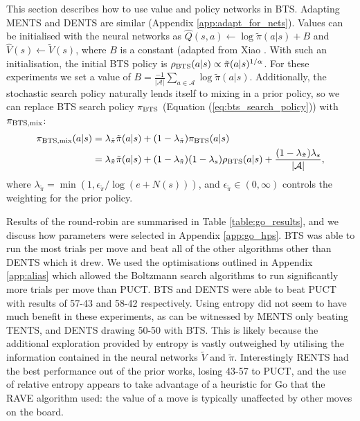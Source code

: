             This section describes how to use value and policy networks in BTS. Adapting MENTS and DENTS are similar (Appendix \ref{app:adapt_for_nets}). Values can be initialised with the neural networks as $\hat{Q}(s,a)\leftarrow\log \tilde{\pi}(a|s)+B$ and $\hat{V}(s)\leftarrow\tilde{V}(s)$, where $B$ is a constant (adapted from Xiao \etal {}%
            . With such an initialisation, the initial BTS policy is 
            $\rho_{\textnormal{BTS}}(a|s)\propto\tilde{\pi}(a|s)^{1/\alpha}$. For these experiments we set a value of $B=\frac{-1}{|\mathcal{A}|}\sum_{a\in\mathcal{A}} \log\tilde{\pi}(a|s)$. Additionally, the stochastic search policy naturally lends itself to mixing in a prior policy, so we can replace BTS search policy $\pi_{\textnormal{BTS}}$ (Equation (\ref{eq:bts_search_policy})) with $\pi_{\textnormal{BTS,mix}}$:
            \begin{align}
                \pi_{\textnormal{BTS,mix}}(a|s) 
                &= \lambda_{\tilde{\pi}}\tilde{\pi}(a|s) + (1-\lambda_{\tilde{\pi}}) \pi_{\textnormal{BTS}}(a|s) \\
                &= \lambda_{\tilde{\pi}}\tilde{\pi}(a|s) + (1-\lambda_{\tilde{\pi}})(1-\lambda_s)\rho_{\textnormal{BTS}}(a|s) + \frac{(1-\lambda_{\tilde{\pi}})\lambda_s}{|\cl{A}|}, %
            \end{align}
            where $\lambda_{\tilde{\pi}}=\min(1,\epsilon_{\tilde{\pi}}/\log(e+N(s)))$, and $\epsilon_{\tilde{\pi}} \in (0,\infty)$ controls the weighting for the prior policy. 

            Results of the round-robin are summarised in Table \ref{table:go_results}, and we discuss how parameters were selected in Appendix \ref{app:go_hps}. BTS was able to run the most trials per move and beat all of the other algorithms other than DENTS which it drew. We used the optimisations outlined in Appendix \ref{app:alias} which allowed the Boltzmann search algorithms to run significantly more trials per move than PUCT. 
            BTS and DENTS were able to beat PUCT with results of 57-43 and 58-42 respectively. Using entropy did not seem to have much benefit in these experiments, as can be witnessed by MENTS only beating TENTS, and DENTS drawing 50-50 with BTS. This is likely because the additional exploration provided by entropy is vastly outweighed by utilising the information contained in the neural networks $\tilde{V}$ and $\tilde{\pi}$. %
            Interestingly RENTS had the best performance out of the prior works, losing 43-57 to PUCT, and the use of relative entropy appears to take advantage of a heuristic for Go that the RAVE %
             algorithm used: the value of a move is typically unaffected by other moves on the board.
            
